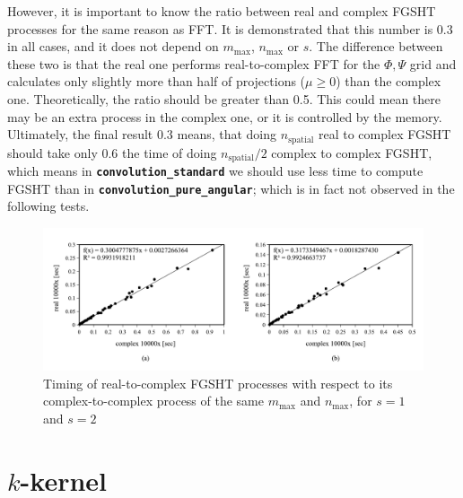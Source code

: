 However, it is important to know the ratio between real and complex
\acs{FGSHT} processes for the same reason as \acs{FFT}. It is demonstrated
that this number is 0.3 in all cases, and it does not depend on $m_{\max}$,
$n_{\max}$ or $s.$ The difference between these two is that the
real one performs real-to-complex \acs{FFT} for the $\Phi,\Psi$
grid and calculates only slightly more than half of projections ($\mu\geq0$)
than the complex one.\textcolor{red}{{} }Theoretically, the ratio should
be greater than 0.5. This could mean there may be an extra process
in the complex one, or it is controlled by the memory. Ultimately,
the final result 0.3 means, that doing $n_{\mathrm{spatial}}$ real
to complex \acs{FGSHT} should take only 0.6 the time of doing $n_{\mathrm{spatial}}/2$
complex to complex \acs{FGSHT}, which means in \texttt{\textbf{convolution\_standard}}
we should use less time to compute \acs{FGSHT} than in \texttt{\textbf{convolution\_pure\_angular}};
which is in fact not observed in the following tests.
\begin{center}
\begin{figure}[H]
\begin{centering}
\includegraphics[bb=20bp 20bp 660bp 235bp,width=1\columnwidth]{_figure/results/fgsht_real_v_cmplx}
\par\end{centering}
\caption[Timing of real-to-complex \acs{FGSHT} processes with respect to its
complex-to-complex process of the same $m_{\max}$ and $n_{\max}$]{Timing of real-to-complex \acs{FGSHT} processes with respect to
its complex-to-complex process of the same $m_{\max}$ and $n_{\max}$,
for $s=1$ and $s=2$\label{fig:fgsht-real-to-complex}}
\end{figure}
\par\end{center}

\section{$k$-kernel\label{sec:-kernel}}

